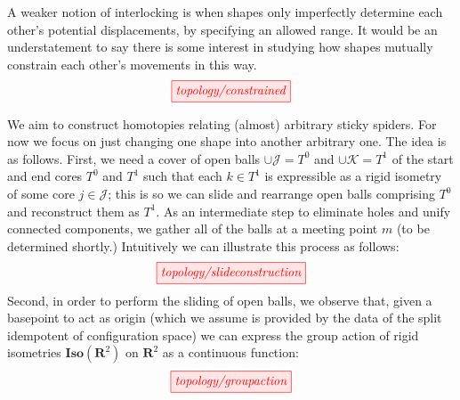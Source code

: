 \begin{myboxB}
\begin{defn}\label{defn:constrained}
A weaker notion of interlocking is when shapes only imperfectly determine each other's potential displacements, by specifying an allowed range. It would be an understatement to say there is some interest in studying how shapes mutually constrain each other's movements in this way.
\[\tikzfig{topology/constrained}\]
\end{defn}
\end{myboxB}

\begin{myboxB}
\begin{construction}\label{cons:morph}
We aim to construct homotopies relating (almost) arbitrary sticky spiders. For now we focus on just changing one shape into another arbitrary one. The idea is as follows. First, we need a cover of open balls $\cup\mathcal{J} = T^0$ and $\cup\mathcal{K} = T^1$ of the start and end cores $T^0$ and $T^1$ such that each $k \in T^1$ is expressible as a rigid isometry of some core $j \in \mathcal{J}$; this is so we can slide and rearrange open balls comprising $T^0$ and reconstruct them as $T^1$. As an intermediate step to eliminate holes and unify connected components, we gather all of the balls at a meeting point $m$ (to be determined shortly.) Intuitively we can illustrate this process as follows:
\[\tikzfig{topology/slideconstruction}\]
Second, in order to perform the sliding of open balls, we observe that, given a basepoint to act as origin (which we assume is provided by the data of the split idempotent of configuration space) we can express the group action of rigid isometries $\mathbf{Iso}(\mathbf{R}^2)$ on $\mathbf{R}^2$ as a continuous function:
\[\tikzfig{topology/groupaction}\]
\end{construction}
\end{myboxB}


